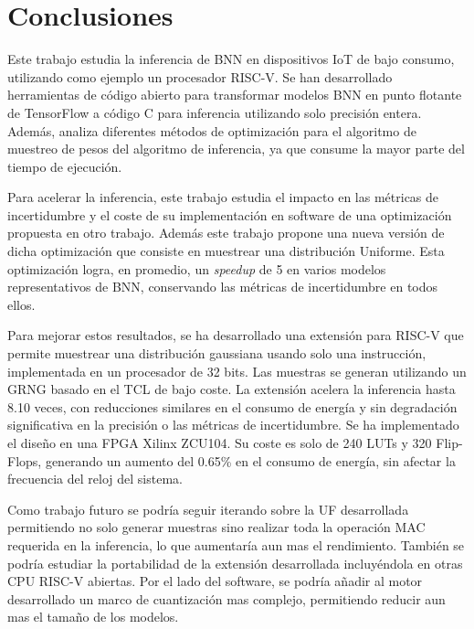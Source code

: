 \chapter{Conclusiones} \label{ch:conclusion}

Este trabajo estudia la inferencia de BNN en dispositivos IoT de bajo consumo, utilizando como ejemplo un procesador RISC-V. Se han desarrollado herramientas de código abierto para transformar modelos BNN en punto flotante de TensorFlow a código C para inferencia utilizando solo precisión entera. Además, analiza diferentes métodos de optimización para el algoritmo de muestreo de pesos del algoritmo de inferencia, ya que consume la mayor parte del tiempo de ejecución.

Para acelerar la inferencia, este trabajo estudia el impacto en las métricas de incertidumbre y el coste de su implementación en software de una optimización propuesta en otro trabajo. Además este trabajo propone una nueva versión de dicha optimización que consiste en muestrear una distribución Uniforme. Esta optimización logra, en promedio, un \textit{speedup} de 5 en varios modelos representativos de BNN, conservando las métricas de incertidumbre en todos ellos.

Para mejorar estos resultados, se ha desarrollado una extensión para RISC-V que permite muestrear una distribución gaussiana usando solo una instrucción, implementada en un procesador de 32 bits. Las muestras se generan utilizando un GRNG basado en el TCL de bajo coste. La extensión acelera la inferencia hasta 8.10 veces, con reducciones similares en el consumo de energía y sin degradación significativa en la precisión o las métricas de incertidumbre. Se ha implementado el diseño en una FPGA Xilinx ZCU104. Su coste es solo de 240 LUTs y 320 Flip-Flops, generando un aumento del 0.65\% en el consumo de energía, sin afectar la frecuencia del reloj del sistema.

Como trabajo futuro se podría seguir iterando sobre la UF desarrollada permitiendo no solo generar muestras sino realizar toda la operación MAC requerida en la inferencia, lo que aumentaría aun mas el rendimiento. También se podría estudiar la portabilidad de la extensión desarrollada incluyéndola en otras CPU RISC-V abiertas. Por el lado del software, se podría añadir al motor desarrollado un marco de cuantización mas complejo, permitiendo reducir aun mas el tamaño de los modelos.
